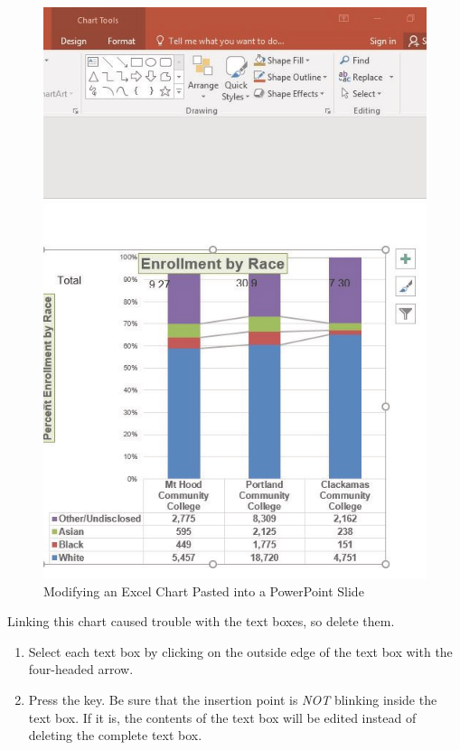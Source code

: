 \begin{figure}[H]
	\centering
	\includegraphics[width=\maxwidth{.95\linewidth}]{gfx/ch04_fig47}
	\caption{Modifying an Excel Chart Pasted into a PowerPoint Slide}
	\label{04:fig47}
\end{figure}

Linking this chart caused trouble with the text boxes, so delete them.

\begin{enumerate}
	\item Select each text box by clicking on the outside edge of the text box with the four-headed arrow.
	\item Press the  key. Be sure that the insertion point is \textit{NOT} blinking inside the text box. If it is, the contents of the text box will be edited instead of deleting the complete text box.
\end{enumerate}

